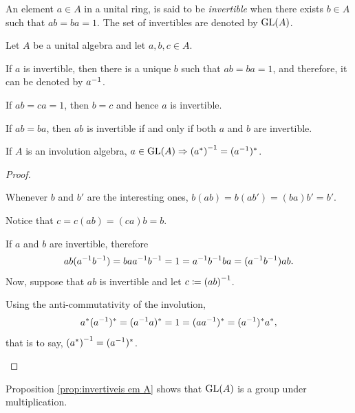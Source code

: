\begin{definicao}
An element $a\in A$ in a unital ring, is said to be \textit{invertible} when there exists $b\in A$ such that $ab=ba=1$. The set of invertibles are denoted by $\operatorname{GL}(A)$.
\end{definicao}

\begin{proposicao}
\label{prop:invertiveis em A}
Let $A$ be a unital algebra and let $a,b,c \in A$.
\begin{itroman}
    \item If $a$ is invertible, then there is a unique $b$ such that $ab=ba=1$, and therefore, it can be denoted by ${a}^{-1}$.
    \item If $ab=ca=1$, then $b=c$ and hence $a$ is invertible. 
    \item If $ab=ba$, then $ab$ is invertible if and only if both
$a$ and $b$ are invertible.
    \item \label{prop:a*^-1 = (a^-1)*} If $A$ is an involution algebra, $a \in \operatorname{GL}(A) \Rightarrow {(a^*)}^{-1} = ({a}^{-1})^*$.
\end{itroman}
\end{proposicao}
\begin{proof}$\left.\right.$
    \begin{itroman}
        \item Whenever $b$ and $b'$ are the interesting ones, $b(ab) = b(ab') = (ba)b' = b'$. 
        \item Notice that $c=c(ab) = (ca)b=b$.
        \item If $a$ and $b$ are invertible, therefore 
        \begin{equation*}
            ab({a}^{-1}{b}^{-1}) = ba{a}^{-1}{b}^{-1} = 1 = {a}^{-1}{b}^{-1}ba=({a}^{-1}{b}^{-1})ab.
        \end{equation*}
        Now, suppose that $ab$ is invertible and let $c \coloneqq {(ab)}^{-1}$. 
        \item Using the anti-commutativity of the involution,
        \begin{equation*}
            a^*({a}^{-1})^* = ({a}^{-1}a)^* = 1 = (a{a}^{-1})^* = ({a}^{-1})^*a^*,
        \end{equation*}
        that is to say, ${(a^*)}^{-1} = ({a}^{-1})^*$. \qedhere
    \end{itroman}
    \end{proof}

Proposition \ref{prop:invertiveis em A} shows that $\operatorname{GL}(A)$ is a group under multiplication. 

